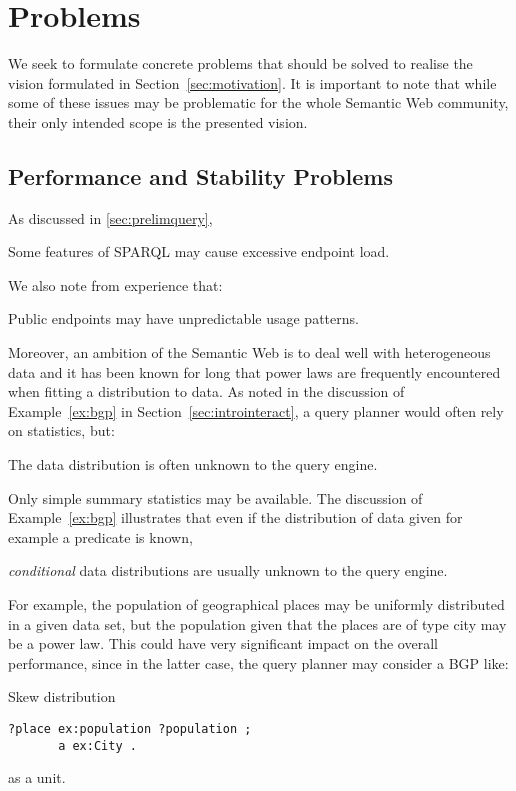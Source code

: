 \section{Problems}\label{sec:problems}

We seek to formulate concrete problems that should be solved to
realise the vision formulated in Section~\ref{sec:motivation}. It is
important to note that while some of these issues may be problematic
for the whole Semantic Web community, their only intended scope is the
presented vision.

\subsection{Performance and Stability Problems}\label{sec:perfproblems}

As discussed in \ref{sec:prelimquery}, 

\begin{problem}\label{prob:sparqlcomplex}
Some features of SPARQL may cause excessive endpoint load.
\end{problem}

We also note from experience that:

\begin{problem}\label{prob:endpointunpred}
Public endpoints may have unpredictable usage patterns.
\end{problem}

Moreover, an ambition of the Semantic Web is to deal well with
heterogeneous data and it has been known for long \cite{1385469} that
power laws are frequently encountered when fitting a distribution to
data. As noted in the discussion of Example~\ref{ex:bgp} in
Section~\ref{sec:introinteract}, a query planner would often rely on
statistics, but:

\begin{problem}\label{prob:unknowndist}
The data distribution is often unknown to the query engine.
\end{problem}
Only simple summary statistics may be available. The discussion of
Example~\ref{ex:bgp} illustrates that even if the distribution of data
given for example a predicate is known, 
\begin{problem}\label{prob:unknownconddist}
\emph{conditional} data distributions are usually unknown to the query engine.
\end{problem}
For example, the population of geographical places may be uniformly
distributed in a given data set, but the population given that the
places are of type city may be a power law. This could have very
significant impact on the overall performance, since in the latter
case, the query planner may consider a BGP like:
\begin{example}{Skew distribution}
\begin{verbatim}
?place ex:population ?population ;
       a ex:City .
\end{verbatim}
\end{example}
as a unit.

